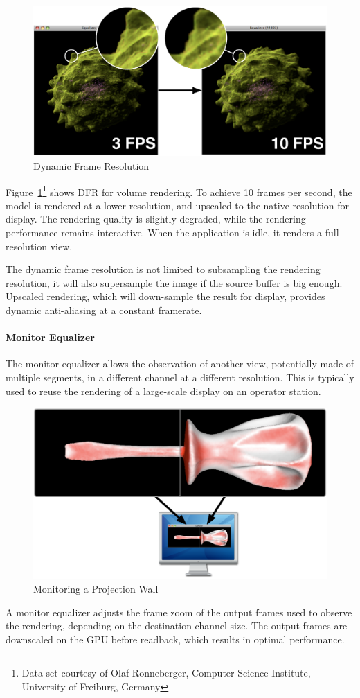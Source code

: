 \documentclass[10pt,a4]{scrartcl}
\newcommand{\fig}[1]{Figure~\ref{#1}}
\begin{document}
\begin{figure}
  \includegraphics[width=.618\textwidth]{images/dfr.pdf}
  {\caption{\label{fDFR}Dynamic Frame Resolution}}
\end{figure}
\fig{fDFR}\footnote{Data set courtesy of Olaf Ronneberger, Computer
  Science Institute, University of Freiburg, Germany} shows DFR for
volume rendering. To achieve 10 frames per second, the model is rendered
at a lower resolution, and upscaled to the native resolution for
display. The rendering quality is slightly degraded, while the rendering
performance remains interactive. When the application is idle, it
renders a full-resolution view.

The dynamic frame resolution is not limited to subsampling the rendering
resolution, it will also supersample the image if the source buffer is big
enough. Upscaled rendering, which will down-sample the result for display,
provides dynamic anti-aliasing at a constant framerate.

\paragraph{Monitor Equalizer}
The monitor equalizer allows the observation of another view,
potentially made of multiple segments, in a different channel at a
different resolution. This is typically used to reuse the rendering of
a large-scale display on an operator station.

\begin{figure}
  \includegraphics[width=.618\textwidth]{images/monitorEq.pdf}
  {\caption{\label{fMonitorEq}Monitoring a Projection Wall}}
\end{figure}
A monitor equalizer adjusts the frame zoom of the output frames used to
observe the rendering, depending on the destination channel size. The
output frames are downscaled on the GPU before readback, which results
in optimal performance.
\end{document}
